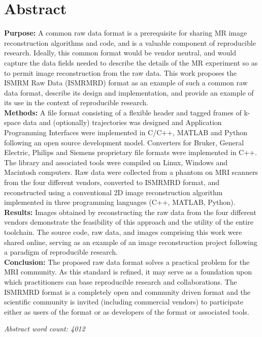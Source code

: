 \documentclass[12pt]{article}
\begin{document}
\section*{Abstract}
\textbf{Purpose:} A common raw data format is a prerequisite for sharing MR image reconstruction algorithms and code, and is a valuable component of reproducible research.  Ideally, this common format would be vendor neutral, and would capture the data fields needed to describe the details of the MR experiment so as to permit image reconstruction from the raw data.  This work proposes the ISMRM Raw Data (ISMRMRD) format as an example of such a common raw data format, describe its design and implementation, and provide an example of its use in the context of reproducible research.\\
\textbf{Methods:} A file format consisting of a flexible header and tagged frames of k-space data and (optionally) trajectories was designed and  Application Programming Interfaces were implemented in C/C++, MATLAB and Python following an open source development model.  Converters for Bruker, General Electric, Philips and Siemens proprietary file formats were implemented in C++. The library and associated tools were compiled on Linux, Windows and Macintosh computers. Raw data were collected from a phantom on MRI scanners from the four different vendors, converted to ISMRMRD format, and reconstructed using a conventional 2D image reconstruction algorithm implemented in three programming languages (C++, MATLAB, Python).\\
\textbf{Results:} Images obtained by reconstructing the raw data from the four different vendors demonstrate the feasibility of this approach and the utility of the entire toolchain.  The source code, raw data, and images comprising this work were shared online, serving as an example of an image reconstruction project following a paradigm of reproducible research.\\
\textbf{Conclusion:} The proposed raw data format solves a practical problem
for the MRI community.  As this standard is refined, it may serve as a foundation upon which practitioners can base reproducible research and collaborations.  The ISMRMRD format is a completely open and community driven format and the scientific community is invited (including commercial vendors) to participate either as users of the format or as developers of the format or associated tools.

\textit{Abstract word count: 4012} %
\end{document}

